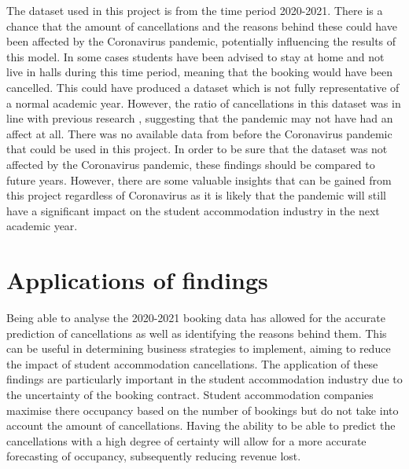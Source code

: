 \vspace{5mm}

The dataset used in this project is from the time period 2020-2021. There is a chance that the amount of cancellations and the reasons behind these could have been affected by the Coronavirus pandemic, potentially influencing the results of this model. In some cases students have been advised to stay at home and not live in halls during this time period, meaning that the booking would have been cancelled. This could have produced a dataset which is not fully representative of a normal academic year. However, the ratio of cancellations in this dataset was in line with previous research \cite{Antonio2017PredictingRevenue}, suggesting that the pandemic may not have had an affect at all. There was no available data from before the Coronavirus pandemic that could be used in this project. In order to be sure that the dataset was not affected by the Coronavirus pandemic, these findings should be compared to future years. However, there are some valuable insights that can be gained from this project regardless of Coronavirus as it is likely that the pandemic will still have a significant impact on the student accommodation industry in the next academic year. 
 
\section{Applications of findings}

Being able to analyse the 2020-2021 booking data has allowed for the accurate prediction of cancellations as well as identifying the reasons behind them. This can be useful in determining business strategies to implement, aiming to reduce the impact of student accommodation cancellations. The application of these findings are particularly important in the student accommodation industry due to the uncertainty of the booking contract. Student accommodation companies maximise there occupancy based on the number of bookings but do not take into account the amount of cancellations. Having the ability to be able to predict the cancellations with a high degree of certainty will allow for a more accurate forecasting of occupancy, subsequently reducing revenue lost. 

\vspace{5mm}

